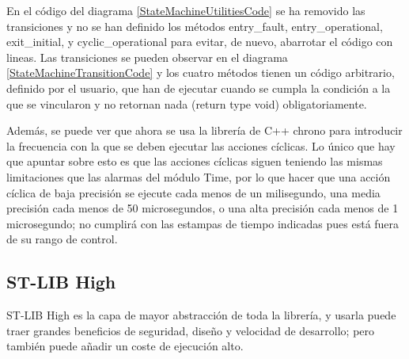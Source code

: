 \documentclass{report}
\begin{document}
En el código del diagrama \ref{StateMachineUtilitiesCode} se ha removido las transiciones y no se han definido los métodos entry\_fault, entry\_operational, exit\_initial, y cyclic\_operational para evitar, de nuevo, abarrotar el código con lineas. Las transiciones se pueden observar en el diagrama \ref{StateMachineTransitionCode} y los cuatro métodos tienen un código arbitrario, definido por el usuario, que han de ejecutar cuando se cumpla la condición a la que se vincularon y no retornan nada (return type void) obligatoriamente. 
\par \vspace{0.3cm}
Además, se puede ver que ahora se usa la librería de C++ chrono para introducir la frecuencia con la que se deben ejecutar las acciones cíclicas. Lo único que hay que apuntar sobre esto es que las acciones cíclicas siguen teniendo las mismas limitaciones que las alarmas del módulo Time, por lo que hacer que una acción cíclica de baja precisión se ejecute cada menos de un milisegundo, una media precisión cada menos de 50 microsegundos, o una alta precisión cada menos de 1 microsegundo; no cumplirá con las estampas de tiempo indicadas pues está fuera de su rango de control. 

\subsection{ST-LIB High}
ST-LIB High es la capa de mayor abstracción de toda la librería, y usarla puede traer grandes beneficios de seguridad, diseño y velocidad de desarrollo; pero también puede añadir un coste de ejecución alto.
\end{document}
